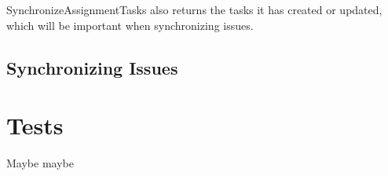 

SynchronizeAssignmentTasks also returns the tasks it has created or updated, which will be important when synchronizing issues.

\subsection{Synchronizing Issues}

\section{Tests}

Maybe maybe